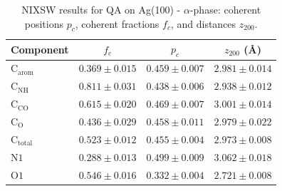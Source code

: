 \documentclass[11pt,a4paper]{article}
\begin{document}
\begin{table}[H]
    \centering
    \caption{NIXSW results for QA on Ag(100) - $\alpha$-phase: coherent positions $p_c$, coherent fractions $f_c$, and distances $z_{200}$.}
    \begin{tabular}{@{}lccc@{}} \toprule
        Component & $f_c$ & $p_c$ & $z_{200}$ (\si{\angstrom}) \\
        \midrule
        $\mathrm{C_{arom}}$ & $0.369 \pm 0.015$ & $0.459 \pm 0.007$ & $2.981 \pm 0.014$ \\
        $\mathrm{C_{NH}}$ & $0.811 \pm 0.031$ & $0.438 \pm 0.006$ & $2.938 \pm 0.012$ \\
        $\mathrm{C_{CO}}$ & $0.615 \pm 0.020$ & $0.469 \pm 0.007$ & $3.001 \pm 0.014$ \\
        $\mathrm{C_{O}}$ & $0.436 \pm 0.029$ & $0.458 \pm 0.011$ & $2.979 \pm 0.022$ \\
        $\mathrm{C_{total}}$ & $0.523 \pm 0.012$ & $0.455 \pm 0.004$ & $2.973 \pm 0.008$ \\ \midrule
        $\mathrm{N1}$ & $0.288 \pm 0.013$ & $0.499 \pm 0.009$ & $3.062 \pm 0.018$ \\ \midrule
        $\mathrm{O1}$ & $0.546 \pm 0.016$ & $0.332 \pm 0.004$ & $2.721 \pm 0.008$ \\
        \bottomrule
    \end{tabular}
    \label{tab:NIXSW-alpha-phase}
\end{table}
\end{document}
